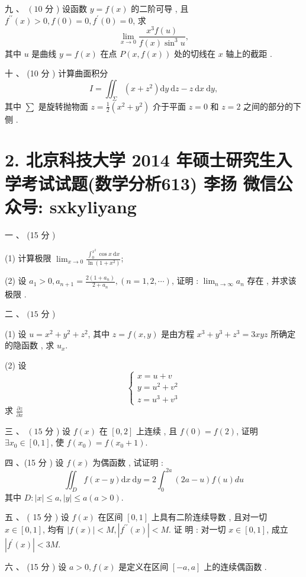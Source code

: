 \documentclass[10pt]{article}
\begin{document}
{ 九 、 $\left(10\right.$  分 )  设函数  $y=f(x)$  的二阶可导 ,  且  $f^{\prime \prime}(x)>0, f(0)=0, f^{\prime}(0)=0$,  求 
$$
\lim _{x \rightarrow 0} \frac{x^{3} f(u)}{f(x) \sin ^{3} u},
$$
 其中  $u$  是曲线  $y=f(x)$  在点  $P(x, f(x))$  处的切线在  $x$  轴上的截距 .

 十 、 (10  分 )  计算曲面积分 
$$
I=\iint_{\Sigma}\left(x+z^{2}\right) \mathrm{d} y \mathrm{~d} z-z \mathrm{~d} x \mathrm{~d} y,
$$
 其中  $\sum$  是旋转抛物面  $z=\frac{1}{2}\left(x^{2}+y^{2}\right)$  介于平面  $z=0$  和  $z=2$  之间的部分的下侧 .

\section{2. 北京科技大学 2014 年硕士研究生入学考试试题(数学分析613) 
 李扬 
 微信公众号: sxkyliyang}
 一 、 (15  分 )

(1)  计算极限  $\lim _{x \rightarrow 0} \frac{\int_{0}^{x^{2}} \cos x \mathrm{~d} x}{\ln \left(1+x^{2}\right)}$;

(2)  设  $a_{1}>0, a_{n+1}=\frac{2\left(1+a_{n}\right)}{2+a_{n}},(n=1,2, \cdots)$,  证明 : $\lim _{n \rightarrow \infty} a_{n}$  存在 ,  并求该极限 .

 二 、 $(15$  分 )

(1)  设  $u=x^{2}+y^{2}+z^{2}$,  其中  $z=f(x, y)$  是由方程  $x^{3}+y^{3}+z^{3}=3 x y z$  所确定的隐函数 ,  求  $u_{x}$.

(2)  设 
$$
\left\{\begin{array}{l}
x=u+v \\
y=u^{2}+v^{2} \\
z=u^{3}+v^{3}
\end{array}\right.
$$
 求  $\frac{\partial z}{\partial x}$

 三 、 $\left(15\right.$  分 )  设  $f(x)$  在  $[0,2]$  上连续 ,  且  $f(0)=f(2)$,  证明  $\exists x_{0} \in[0,1]$,  使  $f\left(x_{0}\right)=f\left(x_{0}+1\right)$.

 四 、(15  分 )  设  $f(x)$  为偶函数 ,  试证明 :
$$
\iint_{D} f(x-y) \mathrm{d} x \mathrm{~d} y=2 \int_{0}^{2 a}(2 a-u) f(u) d u
$$
 其中  $D:|x| \leq a,|y| \leq a(a>0)$.

 五 、 ( 15  分 )  设  $f(x)$  在区间  $[0,1]$  上具有二阶连续导数 ,  且对一切  $x \in[0,1]$,  均有  $|f(x)|<M,\left|f^{\prime \prime}(x)\right|<M$.  证   明 :  对一切  $x \in[0,1]$,  成立  $\left|f^{\prime}(x)\right|<3 M$.

 六 、 (15  分 )  设  $a>0, f(x)$  是定义在区间  $[-a, a]$  上的连续偶函数 .

}
\end{document}
